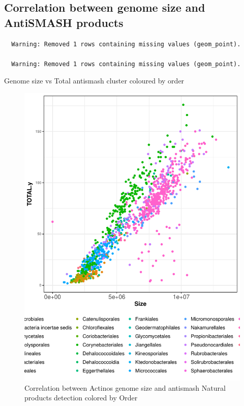 \documentclass[12pt,twoside]{reedthesis}
\begin{document}
  \subsection{Correlation between genome size and AntiSMASH
  products}\label{correlation-between-genome-size-and-antismash-products-1}
  
  \begin{verbatim}
  Warning: Removed 1 rows containing missing values (geom_point).
  
  Warning: Removed 1 rows containing missing values (geom_point).
  \end{verbatim}
  
  Genome size vs Total antismash cluster coloured by order
  
  \begin{figure}[h!tbp]
  \centering
  \includegraphics[angle = 0,scale = 0.6]{chapter4/ActinosSMASHvsSizebyOrder.pdf}
  \caption[Correlation between Actinos genome size and antismash Natural products detection colored by Order]{\normalsize{Correlation between Actinos genome size and antismash Natural products detection colored by Order}}
  \label{fig:ActinosSMASHvsSizebyOrder}
  \end{figure}
  
\end{document}
